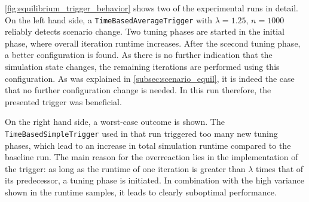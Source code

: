 \autoref{fig:equilibrium_trigger_behavior} shows two of the experimental runs in detail.
On the left hand side, a \texttt{TimeBasedAverageTrigger} with $\lambda=1.25$, $n=1000$ reliably detects scenario change. Two tuning phases are started in the initial phase, where overall iteration runtime increases. After the scecond tuning phase, a better configuration is found. As there is no further indication that the simulation state changes, the remaining iterations are performed using this configuration. As was explained in \autoref{subsec:scenario_equil}, it is indeed the case that no further configuration change is needed. In this run therefore, the presented trigger was beneficial.

On the right hand side, a worst-case outcome is shown. The \texttt{TimeBasedSimpleTrigger} used in that run triggered too many new tuning phases, which lead to an increase in total simulation runtime compared to the baseline run. The main reason for the overreaction lies in the implementation of the trigger: as long as the runtime of one iteration is greater than $\lambda$ times that of its predecessor, a tuning phase is initiated. In combination with the high variance shown in the runtime samples, it leads to clearly suboptimal performance.

